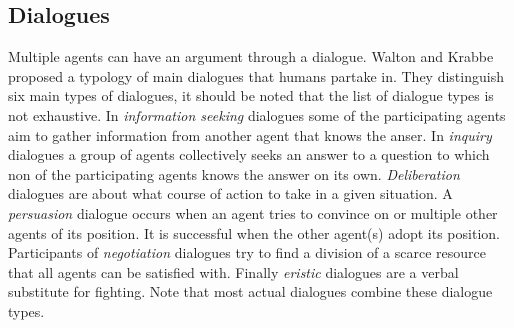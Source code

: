 \documentclass[a4paper]{article}
\begin{document}
\subsection{Dialogues}
Multiple agents can have an argument through a dialogue. Walton and
Krabbe \cite{walton1995} proposed a typology of main dialogues that humans
partake in. They distinguish six main types of dialogues, it should be noted
that the list of dialogue types is not exhaustive. In \emph{information
seeking} dialogues some of the participating agents aim to gather information
from another agent that knows the anser. In \emph{inquiry} dialogues a group of
agents collectively seeks an answer to a question to which non of the
participating agents knows the answer on its own. \emph{Deliberation} dialogues
are about what course of action to take in a given situation. A
\emph{persuasion} dialogue occurs when an agent tries to convince on or
multiple other agents of its position. It is successful when the other agent(s)
adopt its position. Participants of \emph{negotiation} dialogues try to find a
division of a scarce resource that all agents can be satisfied with. Finally
\emph{eristic} dialogues are a verbal substitute for fighting. Note that most
actual dialogues combine these dialogue types.
\end{document}
